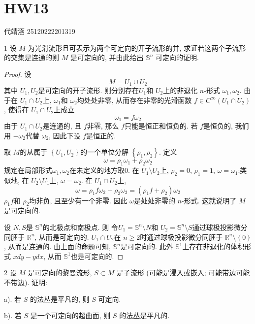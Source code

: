 \documentclass[../main.tex]{subfiles}
\begin{document}
\ifSubfilesClassLoaded{

    
    \setcounter{chapter}{12}
}{}

\chapter{ HW13 }
 代靖涵 25120222201319

\begin{exercise}{1}{}
设 $M$ 为光滑流形且可表示为两个可定向的开子流形的并, 求证若这两个子流形的交集是连通的则 $M$ 是可定向的, 并由此给出 $\mathbb{S}^n$ 可定向的证明.
\end{exercise}
\begin{proof}
设
 $$ M= U_1\cup  U_2 $$
其中 $U_1,U_2$是可定向的开子流形. 则分别存在$U_1$和 $U_2$上的非退化 $n$-形式 $\omega_1,\omega_2$. 由于在 $U_1\cap U_2$上,  $\omega_1$和 $\omega_2$均处处非零, 从而存在非零的光滑函数 $f\in C^{\infty}\left(U_1\cap U_2\right)$, 使得在 $U_1\cap U_2$上成立
 $$ \omega_1= f\omega_2 $$
由于 $U_1\cap U_2$是连通的,  且 $f$非零, 那么 $f$只能是恒正和恒负的. 若 $f$是恒负的, 我们用 $-\omega_{2}$代替 $\omega_{2}$, 因此下设 $f$是恒正的.

取 $M$的从属于 $\left\{ U_1,U_2 \right\}$的一个单位分解 $\left\{ \rho _1 ,\rho _2 \right\}$. 定义
  $$ \omega= \rho _1 \omega_1+ \rho _2 \omega_2 $$
规定在局部形式$\omega_1, \omega_2$在未定义的地方取0.
在 $U_1\setminus U_2$上, $\rho _2 = 0$, $\rho _1 = 1$, $\omega= \omega _1$;类似地, 在 $U_2\setminus U_1$上, $\omega= \omega_2$. 在 $U_1\cap U_2$上,
 $$ \omega= \rho _1 f\omega_2+ \rho _2 \omega_2= \left(\rho _1 f+ \rho _2 \right)\omega_2 $$
$\rho _1f$和 $\rho _2$均非负, 且至少有一个非零. 因此 $\omega$是处处非零的 $n$-形式. 这就说明了 $M$是可定向的.

设 $N,S$是 $\mathbb{S}^{n}$的北极点和南极点. 则 令$U_1= \mathbb{S}^{n}\setminus N$和 $U_2= \mathbb{S}^{n}\setminus S$通过球极投影微分同胚于 $\mathbb{R} ^{n}$, 从而是可定向的. $U_1\cap U_2$在 $n\ge 2$时通过球极投影微分同胚于 $\mathbb{R} ^{n}\setminus \left\{ 0 \right\}$, 从而是连通的. 由上面的命题可知,  $\mathbb{S}^{n}$是可定向的. 此外 $\mathbb{S}^{1}$上存在非退化的体积形式 $xdy-ydx$, 从而 $\mathbb{S}^{1}$也是可定向的.
\end{proof}
\begin{exercise}{2}{}
设 $M$ 是可定向的黎曼流形, $S \subset M$ 是子流形 (可能是浸入或嵌入; 可能带边可能不带边). 证明:

a). 若 $S$ 的法丛是平凡的, 则 $S$ 可定向.

b). 若 $S$ 是一个可定向的超曲面, 则 $S$ 的法丛是平凡的.
\end{exercise}
\end{document}
